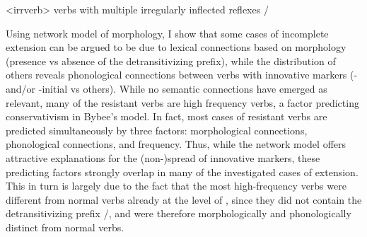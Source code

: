 \documentclass[a4paper]{article}
\begin{document}
\pex<irrverb> \PC verbs with multiple irregularly inflected reflexes
\a {}/ 
\a {} 
\a {} 
\a {} 
\a {} 
\xe

Using  network model of morphology, I show that some cases of incomplete extension can be argued to be due to lexical connections based on morphology (presence vs absence of the detransitivizing prefix), while the distribution of others reveals phonological connections between verbs with innovative markers (- and/or -initial vs others).
While no semantic connections have emerged as relevant, many of the resistant verbs are high frequency verbs, a factor predicting conservativism in Bybee’s model.
In fact, most cases of resistant verbs are predicted simultaneously by three factors: morphological connections, phonological connections, and frequency.
Thus, while the network model offers attractive explanations for the (non-)spread of innovative  markers, these predicting factors strongly overlap in many of the investigated cases of extension.
This in turn is largely due to the fact that the most high-frequency  verbs were different from normal  verbs already at the level of \PC, since they did not contain the detransitivizing prefix /, and were therefore morphologically and phonologically distinct from normal  verbs.
\printbibliography
\end{document}
